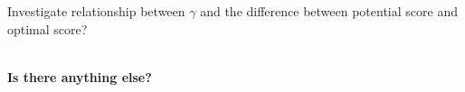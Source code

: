 \documentclass{article}
\theoremstyle{plain}
\theoremstyle{definition}
\theoremstyle{remark}
\begin{document}
Investigate relationship between $\gamma$ and the difference between potential score and optimal score? \\\

\textbf{Is there anything else?}

%
\end{document}
